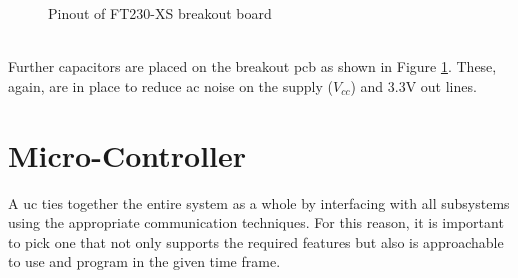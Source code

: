 \documentclass[12pt,a4paper]{report}
\begin{document}
\begin{figure}[h!]
	\caption{Pinout of FT230-XS breakout board}
	\label{fig:ft230xs}
\end{figure}\\
Further capacitors are placed on the breakout \ac{pcb} as shown in Figure \ref{fig:ft230xs}. These, again, are in place to reduce \ac{ac} noise on the supply ($V_{cc}$) and 3.3V out lines.
\section{Micro-Controller}
A \ac{uc} ties together the entire system as a whole by interfacing with all subsystems using the appropriate communication techniques. For this reason, it is important to pick one that not only supports the required features but also is approachable to use and program in the given time frame.
\end{document}
